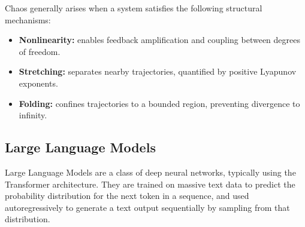 \documentclass[a4paper,12pt]{article}
\begin{document}

Chaos generally arises when a system satisfies the following structural mechanisms:
\begin{itemize}
    \item \textbf{Nonlinearity:} enables feedback amplification and coupling between degrees of freedom.
    \item \textbf{Stretching:} separates nearby trajectories, quantified by positive Lyapunov exponents.
    \item \textbf{Folding:} confines trajectories to a bounded region, preventing divergence to infinity.
\end{itemize}


\cite{Hnon1976ATM}
\cite{ROSSLER1976}
\cite{strogatz_textbook}


\subsection{Large Language Models}
\label{subsec:llms}
Large Language Models are a class of deep neural networks, typically using the Transformer architecture. They are trained on massive text data to predict the probability distribution for the next token in a sequence, and used autoregressively to generate a text output sequentially by sampling from that distribution.
\end{document}
